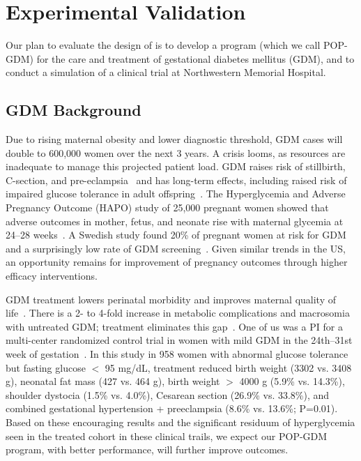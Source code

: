 \section{Experimental Validation}

Our plan to evaluate the design of \poppl{} is to develop a program
(which we call POP-GDM) for the care and treatment of gestational
diabetes mellitus (GDM), and to conduct a simulation of a clinical
trial at Northwestern Memorial Hospital.

\subsection{GDM Background}

Due to rising maternal obesity and lower diagnostic threshold, GDM cases
will double to 600,000 women over the next 3 years. A crisis looms, as
resources are inadequate to manage this projected patient load. GDM
raises risk of stillbirth, C-section, and
pre-eclampsia~\citep{Langer2006} and has long-term effects, including
raised risk of impaired glucose tolerance in adult
offspring~\cite{Metzger2007}. The Hyperglycemia and Adverse Pregnancy
Outcome (HAPO) study of 25,000 pregnant women showed that adverse
outcomes in mother, fetus, and neonate rise with maternal glycemia at
24--28 weeks~\cite{Metzger2008}. A Swedish study found 20\% of
pregnant women at risk for GDM and a surprisingly low rate of GDM
screening~\cite{Persson2009}. Given similar trends in the US, an
opportunity remains for improvement of pregnancy outcomes through
higher efficacy interventions.

GDM treatment lowers perinatal morbidity and improves maternal quality
of life~\cite{Crowther2005}. There is a 2- to 4-fold increase in
metabolic complications and macrosomia with untreated GDM; treatment
eliminates this gap~\cite{Langer2005}. One of us was a PI for a
multi-center randomized control trial in women with mild GDM in the
24th--31st week of gestation~\cite{LandonPeaceman2009}. In this study in
958 women with abnormal glucose tolerance but fasting glucose $<$ 95
mg/dL, treatment reduced birth weight (3302 vs. 3408 g), neonatal fat
mass (427 vs. 464 g), birth weight $>$ 4000 g (5.9\% vs. 14.3\%),
shoulder dystocia (1.5\% vs. 4.0\%), Cesarean section (26.9\%
vs. 33.8\%), and combined gestational hypertension + preeclampsia
(8.6\% vs. 13.6\%; P=0.01). Based on these encouraging results and the
significant residuum of hyperglycemia seen in the treated cohort in
these clinical trails, we expect our POP-GDM program, with better
performance, will further improve outcomes.

